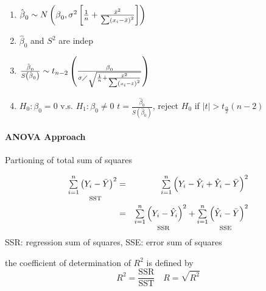 \documentclass{article}
\begin{document}
\begin{enumerate}
\begin{enumerate}
\item $\hat{\beta}_{0}\sim N\left( \beta _{0},\sigma ^{2}\left[ \frac{1}{n}+%
\frac{\bar{x}^{2}}{\tsum \left( x_{i}-\bar{x}\right) ^{2}}\right] \right) $

\item $\hat{\beta}_{0}$ and $S^{2}$ are indep

\item $\frac{\hat{\beta}_{0}}{S\left( \hat{\beta}_{0}\right) }\sim
t_{n-2}\left( \frac{\beta _{0}}{\sigma \diagup \sqrt{\frac{1}{n}+\frac{\bar{x%
}^{2}}{\tsum \left( x_{i}-\bar{x}\right) ^{2}}}}\right) $

\item $H_{0}:\beta _{0}=0$ v.s. $H_{1}:\beta _{0}\neq 0$\newline
$t=\frac{\hat{\beta}_{0}}{S\left( \hat{\beta}_{0}\right) }$, reject $H_{0}$
if $\left\vert t\right\vert >t_{\frac{\alpha }{2}}\left( n-2\right) $
\end{enumerate}
\end{enumerate}

\bigskip

\paragraph{ANOVA Approach}

Partioning of total sum of squares

\begin{eqnarray*}
\underset{\text{SST}}{\tsum\limits_{i=1}^{n}\left( Y_{i}-\bar{Y}\right) ^{2}}
&=&\tsum\limits_{i=1}^{n}\left( Y_{i}-\hat{Y}_{i}+\hat{Y}_{i}-\bar{Y}\right)
^{2} \\
&=&\underset{\text{SSR}}{\tsum\limits_{i=1}^{n}\left( Y_{i}-\hat{Y}%
_{i}\right) ^{2}}+\underset{\text{SSE}}{\tsum\limits_{i=1}^{n}\left( \hat{Y}%
_{i}-\bar{Y}\right) ^{2}}
\end{eqnarray*}%
SSR: regression sum of squares, SSE: error sum of squares

\bigskip 

the coefficient of determination of $R^{2}$ is defined by 
\begin{equation*}
R^{2}=\frac{\text{SSR}}{\text{SST}}\quad R=\sqrt{R^{2}}
\end{equation*}
\end{document}
